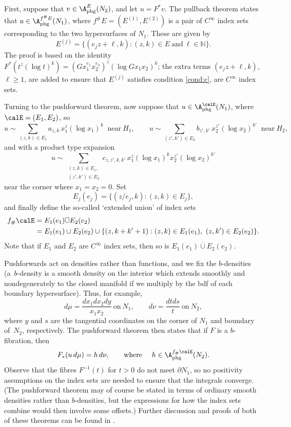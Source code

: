 First, suppose that $v \in \A_{\mathrm{phg}}^E(N_2)$, and let $u = F^* v$. The pullback theorem states that $u \in \A_{\mathrm{phg}}^{f^{\#}E}(N_1)$, where $f^{\#}E = (E^{(1)}, E^{(2)})$ is a pair of $C^\infty$ index sets corresponding to the two hypersurfaces of $N_1$. These are given by
\[
E^{(j)} = \{ (e_j z + \ell, k): (z,k) \in E\ \mbox{and}\ \ell \in \mathbb N \}.
\]
The proof is based on the identity $F^* (t^z (\log t)^k) = (G x_1^{e_1} x_2^{e_2})^z (\log G x_1 x_2)^k$; the extra terms $(e_j z + \ell, k)$, $\ell \geq 1$, are added to ensure that $E^{(j)}$ satisfies condition \eqref{cond:c}, \ie are $C^\infty$ index sets.

Turning to the pushforward theorem, now suppose that $u \in \A_{\mathrm{phg}}^\calE(N_1)$, where $\calE = (E_1, E_2)$, so
\[
u \sim \sum_{(z,k) \in E_1} a_{z,k} \, x_1^z (\log x_1)^k\;\; \mbox{near}\ H_1, \qquad
u \sim \sum_{(z',k') \in E_2} b_{z',k'} \, x_2^{z'} (\log x_2)^{k'}\;\; \mbox{near}\ H_2,
\]
and with a product type expansion
\begin{equation}
u \sim \sum_{\substack{(z,k) \in E_1,\\ (z', k') \in E_2}} c_{z,z', k, k'}\, x_1^z (\log x_1)^k x_2^{z'} (\log x_2)^{k'}
\label{prodexp}
\end{equation}
near the corner where $x_1 = x_2 = 0$. Set
\[
E_j(e_j) = \{(z/e_j, k): (z,k) \in E_j\},
\]
and finally define the so-called `extended union' of index sets
\begin{align*}
f_{\#} \calE &= E_1(e_1) \overline{\cup} E_2(e_2) \\
&= E_1(e_1) \cup E_2(e_2) \cup \{ (z,k+k'+1): (z,k) \in E_1(e_1),\ (z, k') \in E_2(e_2) \}.
\end{align*}
Note that if $E_1$ and $E_2$ are $C^\infty$ index sets, then so is
$E_1(e_1) \overline{\cup} E_2(e_2)$.

Pushforwards act on densities rather than functions, and we fix the $b$-densities (a~$b$\nobreakdash-density is a smooth density on the interior which extends smoothly
and nondegenerately to the closed manifold if we multiply by the bdf of each boundary hypersurface). Thus, for example,
\[
d\mu = \frac{dx_1 dx_2 dy}{x_1 x_2}\ \mbox{on}\ N_1, \qquad d\nu = \frac{dt ds}{t}\ \mbox{on}\ N_2,
\]
where $y$ and $s$ are the tangential coordinates on the corner of $N_1$ and boundary of~$N_2$, respectively.
The pushforward theorem then states that if $F$ is a $b$-fibration, then
\[
F_*(u\, d\mu) = h \, d\nu, \qquad \text{where }\quad h \in \A^{f_{\#}\calE}_{\mathrm{phg}}(N_2).
\]
Observe that the fibres $F^{-1}(t)$ for $t > 0$ do not meet $\partial N_1$, so no positivity assumptions on the index sets are needed to ensure
that the integrals converge.
(The pushforward theorem may of course be stated in terms of ordinary smooth densities rather than $b$-densities, but the expressions for how
the index sets combine would then involve some offsets.) Further discussion and proofs of both of these theorems can be found in \cite{Melrose1992}.

